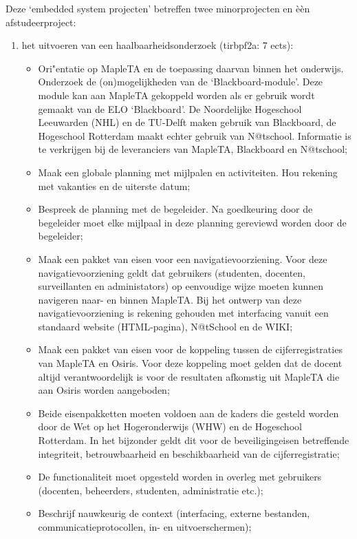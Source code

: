 \label{chap:opdracht}
Deze `embedded system projecten' betreffen twee minorprojecten en \`e\`en afstudeerproject:

\begin{enumerate}
	\item het uitvoeren van een haalbaarheidsonderzoek (tirbpf2a: 7 ects):
		\begin{itemize}
			\item Ori"entatie op MapleTA en de toepassing daarvan binnen het onderwijs. Onderzoek de (on)mogelijkheden van de `Blackboard-module'. Deze module kan aan MapleTA gekoppeld worden als er gebruik wordt gemaakt van de ELO ‘Blackboard’. De Noordelijke Hogeschool Leeuwarden (NHL) en de TU-Delft maken gebruik van Blackboard, de Hogeschool Rotterdam maakt echter gebruik van N@tschool. Informatie is te verkrijgen bij de leveranciers van MapleTA, Blackboard en N@tschool;
			\item Maak een globale planning met mijlpalen en activiteiten. Hou rekening met vakanties en de uiterste datum;
			\item Bespreek de planning met de begeleider. Na goedkeuring door de begeleider moet elke mijlpaal in deze planning gereviewd worden door de begeleider;
			\item Maak een pakket van eisen voor een navigatievoorziening. Voor deze navigatievoorziening geldt dat gebruikers (studenten, docenten, surveillanten en administators) op eenvoudige wijze moeten kunnen navigeren naar- en binnen MapleTA. Bij het ontwerp van deze navigatievoorziening is rekening gehouden met interfacing vanuit een standaard website (HTML-pagina), N@tSchool en de WIKI;
			\item Maak een pakket van eisen voor de koppeling tussen de cijferregistraties van MapleTA en Osiris. Voor deze koppeling moet gelden dat de docent altijd verantwoordelijk is voor de resultaten afkomstig uit MapleTA die aan Osiris worden aangeboden;
			\item Beide eisenpakketten moeten voldoen aan de kaders die gesteld worden door de Wet op het Hogeronderwijs (WHW) en de Hogeschool Rotterdam. In het bijzonder geldt dit voor de beveiligingeisen betreffende integriteit, betrouwbaarheid en beschikbaarheid van de cijferregistratie;
			\item De functionaliteit moet opgesteld worden in overleg met gebruikers (docenten, beheerders, studenten, administratie etc.);
			\item Beschrijf nauwkeurig de context (interfacing, externe bestanden, communicatieprotocollen, in- en uitvoerschermen);

\end{itemize}
\end{enumerate}

